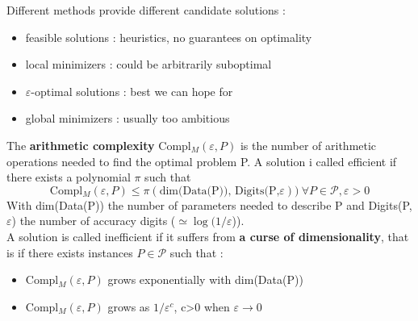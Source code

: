 \documentclass[../main.tex]{subfiles}
\begin{document}
Different methods provide different candidate solutions : \begin{itemize}
    \item feasible solutions : heuristics, no guarantees on optimality\\
    \item local minimizers : could be arbitrarily suboptimal\\
    \item $\varepsilon$-optimal solutions : best we can hope for\\
    \item global minimizers : usually too ambitious\\
\end{itemize}

The \textbf{arithmetic complexity} Compl${}_M (\varepsilon, P)$ is the number of arithmetic operations needed to find the optimal problem P.
A solution i called efficient if there exists a polynomial $\pi$ such that \begin{equation}
        \text{Compl}{}_M (\varepsilon, P) \leq \pi(\text{dim(Data(P)), Digits(P,}\varepsilon)) \: \forall P\in \mathcal{P}, \varepsilon>0
    \end{equation}
With dim(Data(P)) the number of parameters needed to describe P and Digits(P, $\varepsilon$) the number of accuracy digits ($\simeq \log (1/\varepsilon$)).\\


A solution is called inefficient if it suffers from \textbf{a curse of dimensionality}, that is if there exists instances $P\in \mathcal{P}$ such that : \begin{itemize}
    \item Compl${}_M(\varepsilon, P)$ grows exponentially with dim(Data(P))\\
    \item Compl${}_M(\varepsilon, P)$ grows as $1/\varepsilon^c$, c>0 when $\varepsilon \rightarrow 0$\\
\end{itemize}
\end{document}
